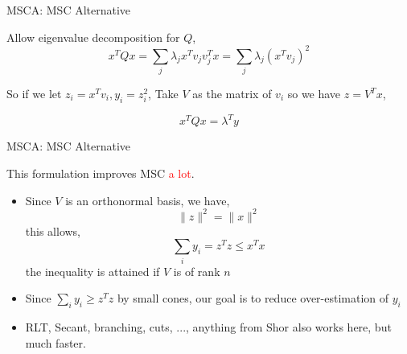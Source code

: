 


\begin{frame}{MSCA: MSC Alternative}

  Allow eigenvalue decomposition for \(Q\),
  \[x^TQx = \sum_j \lambda_j x^Tv_jv_j^Tx = \sum_j \lambda_j (x^Tv_j)^2\]

  So if we let \(z_i = x^Tv_i, y_i = z_i^2\), Take \(V\) as the matrix of \(v_i\) so we have \(z = V^Tx\),

  \[x^TQx = \lambda^Ty\]
\end{frame}

\begin{frame}{MSCA: MSC Alternative}

  This formulation improves MSC \textcolor{red}{a lot}.
  \begin{itemize}
    \item Since \(V\) is an orthonormal basis, we have,
          \[\|z\|^2 = \|x\|^2\]
          this allows,
          \[\sum_i y_i = z^Tz \le x^Tx\]
          the inequality is attained if \(V\) is of rank \(n\)
    \item Since \(\sum_i y_i \ge z^Tz\) by small cones, our goal is to reduce over-estimation of \(y_i\)
    \item RLT, Secant, branching, cuts, ..., anything from Shor also works here, but much faster.
  \end{itemize}
\end{frame}

